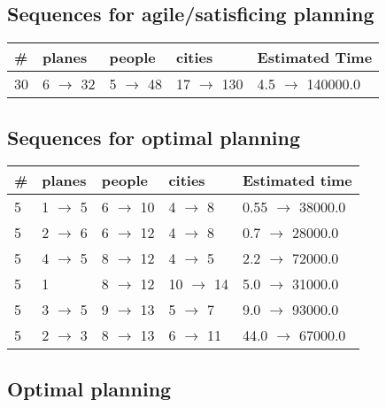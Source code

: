 \documentclass{article}
\begin{document}
                         \subsection*{Sequences for agile/satisficing planning}

                        \begin{center}
                        \begin{tabular}{@{}l|l|l|l|l@{}}
                        \# & planes & people & cities & Estimated Time\\\midrule
                        30&6 $\rightarrow$ 32&5 $\rightarrow$ 48&17 $\rightarrow$ 130&4.5 $\rightarrow$ 140000.0
                        \end{tabular}
                        \end{center}
                    
                            \subsection*{Sequences for optimal planning}

                            \begin{center}
                            \begin{tabular}{@{}l|l|l|l|l@{}}
                            \# & planes & people & cities & Estimated time\\\midrule
                            5&1 $\rightarrow$ 5&6 $\rightarrow$ 10&4 $\rightarrow$ 8&0.55 $\rightarrow$ 38000.0\\
5&2 $\rightarrow$ 6&6 $\rightarrow$ 12&4 $\rightarrow$ 8&0.7 $\rightarrow$ 28000.0\\
5&4 $\rightarrow$ 5&8 $\rightarrow$ 12&4 $\rightarrow$ 5&2.2 $\rightarrow$ 72000.0\\
5&1&8 $\rightarrow$ 12&10 $\rightarrow$ 14&5.0 $\rightarrow$ 31000.0\\
5&3 $\rightarrow$ 5&9 $\rightarrow$ 13&5 $\rightarrow$ 7&9.0 $\rightarrow$ 93000.0\\
5&2 $\rightarrow$ 3&8 $\rightarrow$ 13&6 $\rightarrow$ 11&44.0 $\rightarrow$ 67000.0
                            \end{tabular}
                            \end{center}
                    
                                \subsection*{Optimal planning}
                                
\end{document}
